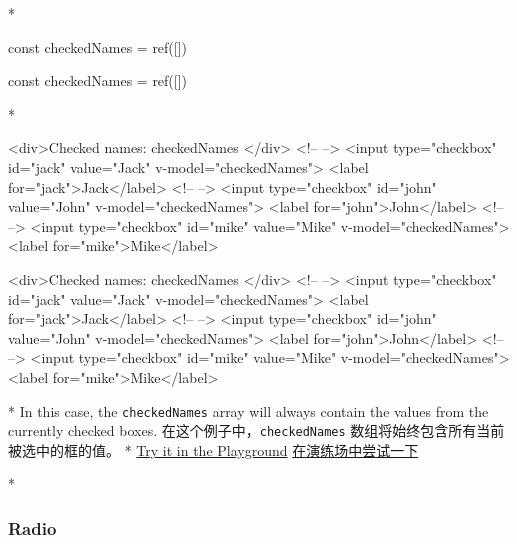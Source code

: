 \begin{paracol}{2}
\switchcolumn[0]*%
\begin{codeJs}
const checkedNames = ref([])
\end{codeJs}
\switchcolumn
\begin{codeJs}
const checkedNames = ref([])
\end{codeJs}
\switchcolumn[0]*%
\begin{codeHtml}
<div>Checked names: {{ checkedNames }}</div>
<!-- -->
<input type="checkbox" id="jack" value="Jack" v-model="checkedNames">
<label for="jack">Jack</label>
<!-- -->
<input type="checkbox" id="john" value="John" v-model="checkedNames">
<label for="john">John</label>
<!-- -->
<input type="checkbox" id="mike" value="Mike" v-model="checkedNames">
<label for="mike">Mike</label>
\end{codeHtml}
\switchcolumn
\begin{codeHtml}
<div>Checked names: {{ checkedNames }}</div>
<!-- -->
<input type="checkbox" id="jack" value="Jack" v-model="checkedNames">
<label for="jack">Jack</label>
<!-- -->
<input type="checkbox" id="john" value="John" v-model="checkedNames">
<label for="john">John</label>
<!-- -->
<input type="checkbox" id="mike" value="Mike" v-model="checkedNames">
<label for="mike">Mike</label>
\end{codeHtml}
\switchcolumn[0]*%
In this case, the \texttt{checkedNames} array will always contain the
values from the currently checked boxes.
\switchcolumn
在这个例子中，\texttt{checkedNames}
数组将始终包含所有当前被选中的框的值。
\switchcolumn[0]*%
\href{https://play.vuejs.org/\#eNqVkUtqwzAURbfy0CTtoNU8KILSWaHdQNWBIj8T1fohyybBeO+RbOc3i2e+vHvuMWggHyG89x2SLWGtijokaDF1gQunbfAxwQARaxihjt7CJlc3wgmnvGsTqAOqBqsfabGFXSm+/P69CsfovJVXckhog5EJcwJgle7558yBK+AWhuFxaRwZLbVCZ0K70CVIp4A7Qabi3h8FAV3l/C9Vk797abpy/lrim/UVmkt/Gc4HOv+EkXs0UPt4XeCFZHQ6lM4TZn9w9+YlrjFPCC/kKrPVDd6Zv5e4wjwv8ELezIxeX4qMZwHduAs=}{Try
it in the Playground}
\switchcolumn
\href{https://play.vuejs.org/\#eNqVkUtqwzAURbfy0CTtoNU8KILSWaHdQNWBIj8T1fohyybBeO+RbOc3i2e+vHvuMWggHyG89x2SLWGtijokaDF1gQunbfAxwQARaxihjt7CJlc3wgmnvGsTqAOqBqsfabGFXSm+/P69CsfovJVXckhog5EJcwJgle7558yBK+AWhuFxaRwZLbVCZ0K70CVIp4A7Qabi3h8FAV3l/C9Vk797abpy/lrim/UVmkt/Gc4HOv+EkXs0UPt4XeCFZHQ6lM4TZn9w9+YlrjFPCC/kKrPVDd6Zv5e4wjwv8ELezIxeX4qMZwHduAs=}{在演练场中尝试一下}


\switchcolumn[0]*%
\subsubsection{Radio}
\switchcolumn

\end{paracol}
